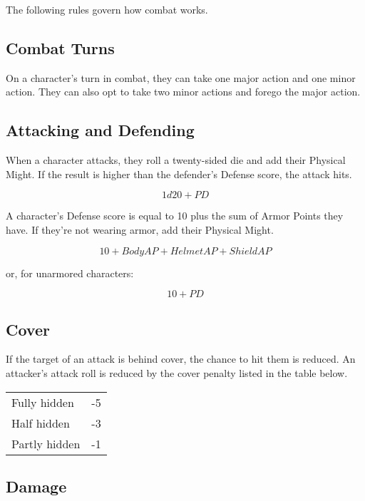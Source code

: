 \begin{multicols}{2}
The following rules govern how combat works.

\subsection{Combat Turns}

On a character's turn in combat, they can take one major action and one minor action.
They can also opt to take two minor actions and forego the major action.

\subsection{Attacking and Defending}

When a character attacks, they roll a twenty-sided die and add their Physical
Might. If the result is higher than the defender's Defense score, the attack hits.

$$1d20 + PD$$

A character's Defense score is equal to 10 plus the sum of Armor Points they
have. If they're not wearing armor, add their Physical Might.

$$10 + Body AP + Helmet AP + Shield AP$$

or, for unarmored characters:

$$10 + PD$$

\subsection{Cover}

If the target of an attack is behind cover, the chance to hit them is reduced.
An attacker's attack roll is reduced by the cover penalty listed in the table
below.

\begin{center}
{
\begin{xtabular}{|l|l|}
Fully hidden & -5 \\
Half hidden & -3 \\
Partly hidden & -1 \\
\hline
\end{xtabular}
}
\end{center}

\subsection{Damage}


\end{multicols}
